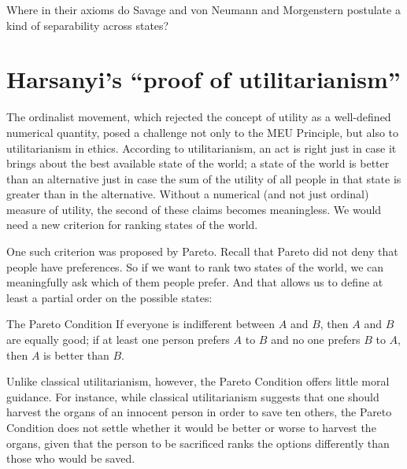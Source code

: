 \begin{exercise2}
  Where in their axioms do Savage and von Neumann and Morgenstern
  postulate a kind of separability across states?
\end{exercise2}

\section{Harsanyi's ``proof of utilitarianism''}

The ordinalist movement, which rejected the concept of utility as a
well-defined numerical quantity, posed a challenge not only to the MEU
Principle, but also to utilitarianism in ethics. According to
utilitarianism, an act is right just in case it brings about the best
available state of the world; a state of the world is better than
an alternative just in case the sum of the utility of all people in
that state is greater than in the alternative. Without a numerical
(and not just ordinal) measure of utility, the second of these claims
becomes meaningless. We would need a new criterion for ranking states
of the world.

One such criterion was proposed by Pareto. Recall that Pareto did not
deny that people have preferences. So if we want to rank two states of
the world, we can meaningfully ask which of them people prefer. And
that allows us to define at least a partial order on the possible
states:
%
\begin{genericthm}{The Pareto Condition}
  If everyone is indifferent between  $A$ and $B$, then $A$ and $B$
  are equally good; if at least one person prefers $A$ to $B$ and no
  one prefers $B$ to $A$, then $A$ is better than $B$.
\end{genericthm}
%

Unlike classical utilitarianism, however, the Pareto Condition offers
little moral guidance. For instance, while classical utilitarianism
suggests that one should harvest the organs of an innocent person in
order to save ten others, the Pareto Condition does not settle whether
it would be better or worse to harvest the organs, given that the
person to be sacrificed ranks the options differently than those who
would be saved.


